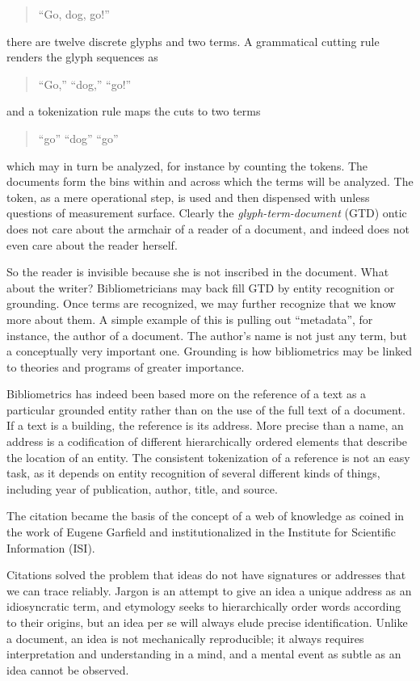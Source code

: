 \documentclass[]{book}
\theoremstyle{definition}
\theoremstyle{definition}
\theoremstyle{definition}
\theoremstyle{remark}
\begin{document}
\begin{quote}
``Go, dog, go!''
\end{quote}

there are twelve discrete glyphs and two terms. A grammatical cutting
rule renders the glyph sequences as

\begin{quote}
``Go,'' ``dog,'' ``go!''
\end{quote}

and a tokenization rule maps the cuts to two terms

\begin{quote}
``go'' ``dog'' ``go''
\end{quote}

which may in turn be analyzed, for instance by counting the tokens. The
documents form the bins within and across which the terms will be
analyzed. The token, as a mere operational step, is used and then
dispensed with unless questions of measurement surface. Clearly the
\emph{glyph-term-document} (GTD) ontic does not care about the armchair
of a reader of a document, and indeed does not even care about the
reader herself.

So the reader is invisible because she is not inscribed in the document.
What about the writer? Bibliometricians may back fill GTD by entity
recognition or grounding. Once terms are recognized, we may further
recognize that we know more about them. A simple example of this is
pulling out ``metadata'', for instance, the author of a document. The
author's name is not just any term, but a conceptually very important
one. Grounding is how bibliometrics may be linked to theories and
programs of greater importance.

Bibliometrics has indeed been based more on the reference of a text as a
particular grounded entity rather than on the use of the full text of a
document. If a text is a building, the reference is its address. More
precise than a name, an address is a codification of different
hierarchically ordered elements that describe the location of an entity.
The consistent tokenization of a reference is not an easy task, as it
depends on entity recognition of several different kinds of things,
including year of publication, author, title, and source.

The citation became the basis of the concept of a web of knowledge as
coined in the work of Eugene Garfield and institutionalized in the
Institute for Scientific Information (ISI).

Citations solved the problem that ideas do not have signatures or
addresses that we can trace reliably. Jargon is an attempt to give an
idea a unique address as an idiosyncratic term, and etymology seeks to
hierarchically order words according to their origins, but an idea per
se will always elude precise identification. Unlike a document, an idea
is not mechanically reproducible; it always requires interpretation and
understanding in a mind, and a mental event as subtle as an idea cannot
be observed.
\end{document}
